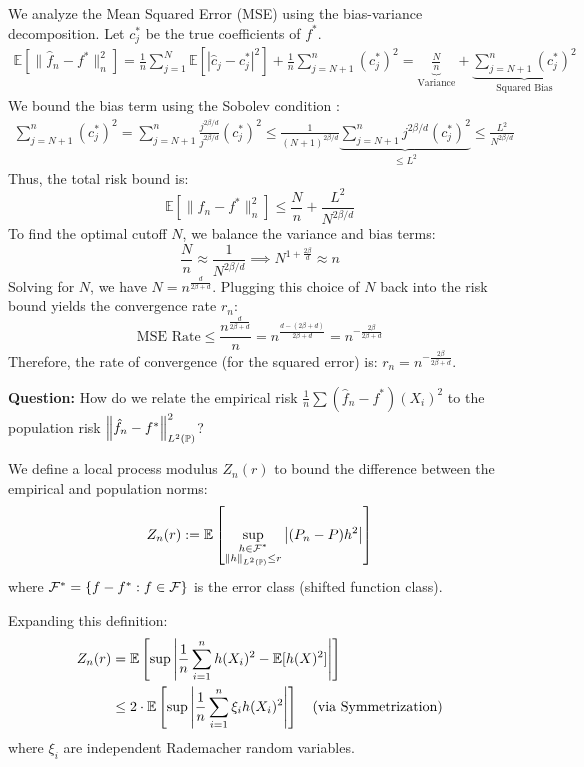 We analyze the Mean Squared Error (MSE) using the bias-variance decomposition. Let $c_j^*$ be the true coefficients of $f^*$.
\begin{align*}
    \mathbb{E}\left[ \|\hat{f}_n - f^*\|_n^2 \right] = \frac{1}{n} \sum_{j=1}^N \mathbb{E}\left[ |\hat{c}_j - c_j^*|^2 \right] + \frac{1}{n} \sum_{j=N+1}^n (c_j^*)^2 = \underbrace{\frac{N}{n}}_{\text{Variance}} + \underbrace{\sum_{j=N+1}^n (c_j^*)^2}_{\text{Squared Bias}}
\end{align*}
We bound the bias term using the Sobolev condition :
\begin{align*}
    \sum_{j=N+1}^n (c_j^*)^2 = \sum_{j=N+1}^n \frac{j^{2\beta/d}}{j^{2\beta/d}} (c_j^*)^2\le \frac{1}{(N+1)^{2\beta/d}} \underbrace{\sum_{j=N+1}^n j^{2\beta/d} (c_j^*)^2}_{\le L^2} \le \frac{L^2}{N^{2\beta/d}}
\end{align*}
Thus, the total risk bound is:
\begin{equation*}
    \mathbb{E}\left[ \|\hat{f}_n - f^*\|_n^2 \right] \le \frac{N}{n} + \frac{L^2}{N^{2\beta/d}}
\end{equation*}
To find the optimal cutoff $N$, we balance the variance and bias terms:
\begin{equation*}
    \frac{N}{n} \approx \frac{1}{N^{2\beta/d}} \implies N^{1 + \frac{2\beta}{d}} \approx n
\end{equation*}
Solving for $N$, we have $N = n^{\frac{d}{2\beta + d}}$. Plugging this choice of $N$ back into the risk bound yields the convergence rate $r_n$:
\begin{equation*}
    \text{MSE Rate} \le \frac{n^{\frac{d}{2\beta+d}}}{n} = n^{\frac{d - (2\beta+d)}{2\beta+d}} = n^{-\frac{2\beta}{2\beta+d}}
\end{equation*}
Therefore, the rate of convergence (for the squared error) is: $r_n = n^{-\frac{2\beta}{2\beta+d}}$.


\textbf{Question:} How do we relate the empirical risk $\frac{1}{n} \sum (\hat f_n - f^*)(X_i)^2$ to the population risk $\left\lVert\hat f_n - f^*\right\rVert_{L^2(\mathbb{P})}^2$?

We define a local process modulus $Z_n(r)$ to bound the difference between the empirical and population norms:
\[
Z_n(r) := \mathbb{E} \left[ \sup_{\substack{h \in \mathcal{F}^* \\ \left\lVert h\right\rVert_{L^2(\mathbb{P})} \le r}} \left| (P_n - P)h^2 \right| \right]
\]
where $\mathcal{F}^* = \{ f - f^* : f \in \mathcal{F} \}$ is the error class (shifted function class).

Expanding this definition:
\begin{align*}
Z_n(r) &= \mathbb{E} \left[ \sup \left| \frac{1}{n}\sum_{i=1}^n h(X_i)^2 - \mathbb{E}[h(X)^2] \right| \right] \\
&\le 2 \cdot \mathbb{E} \left[ \sup \left| \frac{1}{n}\sum_{i=1}^n \xi_i h(X_i)^2 \right| \right] \quad \text{(via Symmetrization)}
\end{align*}
where $\xi_i$ are independent Rademacher random variables.

